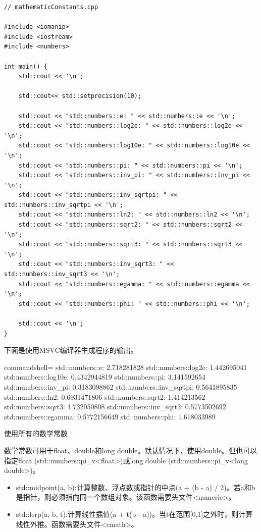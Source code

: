 \begin{lstlisting}[style=styleCXX]
// mathematicConstants.cpp

#include <iomanip>
#include <iostream>
#include <numbers>

int main() {
	std::cout << '\n';
	
	std::cout<< std::setprecision(10);
	
	std::cout << "std::numbers::e: " << std::numbers::e << '\n';
	std::cout << "std::numbers::log2e: " << std::numbers::log2e << '\n';
	std::cout << "std::numbers::log10e: " << std::numbers::log10e << '\n';
	std::cout << "std::numbers::pi: " << std::numbers::pi << '\n';
	std::cout << "std::numbers::inv_pi: " << std::numbers::inv_pi << '\n';
	std::cout << "std::numbers::inv_sqrtpi: " << std::numbers::inv_sqrtpi << '\n';
	std::cout << "std::numbers::ln2: " << std::numbers::ln2 << '\n';
	std::cout << "std::numbers::sqrt2: " << std::numbers::sqrt2 << '\n';
	std::cout << "std::numbers::sqrt3: " << std::numbers::sqrt3 << '\n';
	std::cout << "std::numbers::inv_sqrt3: " << std::numbers::inv_sqrt3 << '\n';
	std::cout << "std::numbers::egamma: " << std::numbers::egamma << '\n';
	std::cout << "std::numbers::phi: " << std::numbers::phi << '\n';
	
	std::cout << '\n';
}
\end{lstlisting}

下面是使用MSVC编译器生成程序的输出。

\begin{tcblisting}{commandshell={}}
std::numbers::e: 2.718281828
std::numbers::log2e: 1.442695041
std::numbers::log10e: 0.4342944819
std::numbers::pi: 3.141592654
std::numbers::inv_pi: 0.3183098862
std::numbers::inv_sqrtpi: 0.5641895835
std::numbers::ln2: 0.6931471806
std::numbers::sqrt2: 1.414213562
std::numbers::sqrt3: 1.732050808
std::numbers::inv_sqrt3: 0.5773502692
std::numbers::egamma: 0.5772156649
std::numbers::phi: 1.618033989
\end{tcblisting}

\begin{center}
使用所有的数学常数
\end{center}

数学常数可用于float、double和long double。默认情况下，使用double。但也可以指定float (std::numbers::pi\_v<float>)或long double (std::numbers::pi\_v<long double>)。


\begin{itemize}
\item 
std::midpoint(a, b):计算整数、浮点数或指针的中点(a + (b - a) / 2)。若a和b是指针，则必须指向同一个数组对象。该函数需要头文件<numeric>。

\item 
std::lerp(a, b, t):计算线性插值(a + t(b - a))。当t在范围[0,1]之外时，则计算线性外推。函数需要头文件<cmath>。
\end{itemize}


